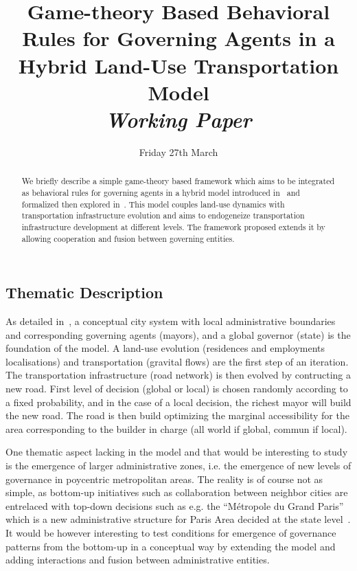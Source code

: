 


\title{Game-theory Based Behavioral Rules for Governing Agents in a Hybrid Land-Use Transportation Model \bigskip\\
\textit{Working Paper}
}
\author{}
\date{Friday 27th March}


\maketitle

\justify

\begin{abstract}
We briefly describe a simple game-theory based framework which aims to be integrated as behavioral rules for governing agents in a hybrid model introduced in~\cite{le2010approche} and formalized then explored in~\cite{lenechet2012}. This model couples land-use dynamics with transportation infrastructure evolution and aims to endogeneize transportation infrastructure development at different levels. The framework proposed extends it by allowing cooperation and fusion between governing entities.
\end{abstract}


\subsection*{Thematic Description}

As detailed in~\cite{lenechet2012}, a conceptual city system with local administrative boundaries and corresponding governing agents (mayors), and a global governor (state) is the foundation of the model. A land-use evolution (residences and employments localisations) and transportation (gravital flows) are the first step of an iteration. The transportation infrastructure (road network) is then evolved by contructing a new road. First level of decision (global or local) is chosen randomly according to a fixed probability, and in the case of a local decision, the richest mayor will build the new road. The road is then build optimizing the marginal accessibility for the area corresponding to the builder in charge (all world if global, commun if local).

One thematic aspect lacking in the model and that would be interesting to study is the emergence of larger administrative zones, i.e. the emergence of new levels of governance in poycentric metropolitan areas. The reality is of course not as simple, as bottom-up initiatives such as collaboration between neighbor cities are entrelaced with top-down decisions such as e.g. the ``M{\'e}tropole du Grand Paris'' which is a new administrative structure for Paris Area decided at the state level~\cite{gilli2009paris}. It would be however interesting to test conditions for emergence of governance patterns from the bottom-up in a conceptual way by extending the model and adding interactions and fusion between administrative entities.

